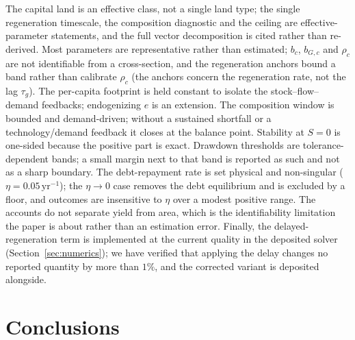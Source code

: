 \documentclass[preprint,12pt,authoryear]{elsarticle}
\begin{document}
The capital land is an effective class, not a single land type; the single regeneration timescale, the composition diagnostic and the ceiling are effective-parameter statements, and the full vector decomposition is cited rather than re-derived. Most parameters are representative rather than estimated; $b_c$, $b_{G,c}$ and $\rho_c$ are not identifiable from a cross-section, and the regeneration anchors bound a band rather than calibrate $\rho_c$ (the anchors concern the regeneration rate, not the lag $\tau_g$). The per-capita footprint is held constant to isolate the stock--flow--demand feedbacks; endogenizing $e$ is an extension. The composition window is bounded and demand-driven; without a sustained shortfall or a technology/demand feedback it closes at the balance point. Stability at $S=0$ is one-sided because the positive part is exact. Drawdown thresholds are tolerance-dependent bands; a small margin next to that band is reported as such and not as a sharp boundary. The debt-repayment rate is set physical and non-singular ($\eta=0.05\,\mathrm{yr}^{-1}$); the $\eta\to0$ case removes the debt equilibrium and is excluded by a floor, and outcomes are insensitive to $\eta$ over a modest positive range. The accounts do not separate yield from area, which is the identifiability limitation the paper is about rather than an estimation error. Finally, the delayed-regeneration term is implemented at the current quality in the deposited solver (Section~\ref{sec:numerics}); we have verified that applying the delay changes no reported quantity by more than $1\%$, and the corrected variant is deposited alongside.

\section{Conclusions}\label{sec:conclusions}
\end{document}
